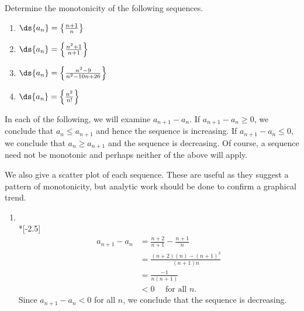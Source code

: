 
\begin{example}\label{ex_seq7}
Determine the monotonicity of the following sequences.
\begin{multicols}{2}
\begin{enumerate}
\item $\ds \{a_n\} = \left\{\frac{n+1}n\right\}$
\item	$\ds \{a_n\} = \left\{\frac{n^2+1}{n+1}\right\}$	
\item $\ds \{a_n\} = \left\{\frac{n^2-9}{n^2-10n+26}\right\}$
\item	$\ds \{a_n\} = \left\{\frac{n^2}{n!}\right\}$	
\end{enumerate}
\end{multicols}
\solution
In each of the following, we will examine $a_{n+1}-a_n$. If $a_{n+1}-a_n \ge0$, we conclude that $a_n\le a_{n+1}$ and hence the sequence is increasing. If $a_{n+1}-a_n\le0$, we conclude that $a_n\ge a_{n+1}$ and the sequence is decreasing. Of course, a sequence need not be monotonic and perhaps neither of the above will apply.

We also give a scatter plot of each sequence. These are useful as they suggest a pattern of monotonicity, but analytic work should be done to confirm a graphical trend.

\begin{enumerate}
\item\mbox{}\\*[-2.5\baselineskip]
\begin{align*}
a_{n+1}-a_n &= \frac{n+2}{n+1} - \frac{n+1}{n} \\		
	&= \frac{(n+2)(n)-(n+1)^2}{(n+1)n} \\
	&=	\frac{-1}{n(n+1)} \\
	&<0 \quad\text{ for all $n$.}
\end{align*}
%
%
Since $a_{n+1}-a_n<0$ for all $n$, we conclude that the sequence is decreasing.


\end{enumerate}
\end{example}
